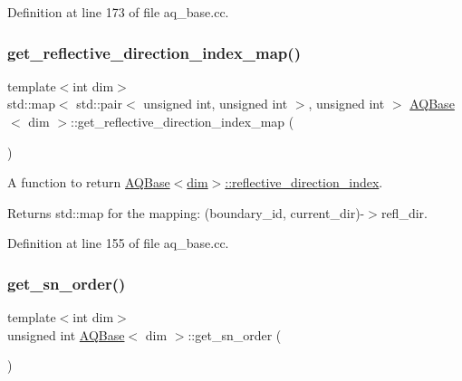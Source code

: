 Definition at line 173 of file aq\+\_\+base.\+cc.

\mbox{\label{class_a_q_base_a1cb901657861f7fc580fc29e10c0b691}} 
\subsubsection{\texorpdfstring{get\+\_\+reflective\+\_\+direction\+\_\+index\+\_\+map()}{get\_reflective\_direction\_index\_map()}}
{\footnotesize\ttfamily template$<$int dim$>$ \\
std\+::map$<$ std\+::pair$<$ unsigned int, unsigned int $>$, unsigned int $>$ \hyperlink{class_a_q_base}{A\+Q\+Base}$<$ dim $>$\+::get\+\_\+reflective\+\_\+direction\+\_\+index\+\_\+map (\begin{DoxyParamCaption}{ }\end{DoxyParamCaption})}

A function to return \hyperlink{class_a_q_base_a9aa6c274dd0ef167528bbec76637cc22}{A\+Q\+Base$<$dim$>$\+::reflective\+\_\+direction\+\_\+index}.

\begin{DoxyReturn}{Returns}
std\+::map for the mapping\+: (boundary\+\_\+id, current\+\_\+dir)-\/$>$refl\+\_\+dir. 
\end{DoxyReturn}


Definition at line 155 of file aq\+\_\+base.\+cc.

\mbox{\label{class_a_q_base_a9ce78884d13c584a8f415c16976ea6f0}} 
\subsubsection{\texorpdfstring{get\+\_\+sn\+\_\+order()}{get\_sn\_order()}}
{\footnotesize\ttfamily template$<$int dim$>$ \\
unsigned int \hyperlink{class_a_q_base}{A\+Q\+Base}$<$ dim $>$\+::get\+\_\+sn\+\_\+order (\begin{DoxyParamCaption}{ }\end{DoxyParamCaption})}

